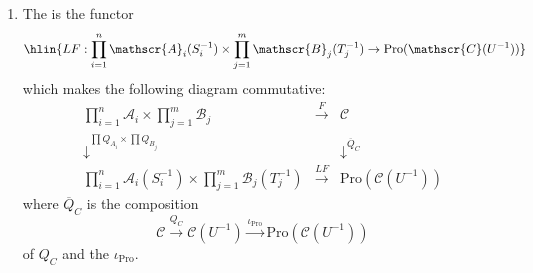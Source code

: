 \begin{definition}
\begin{enumerate}
    \item The  is the functor
    $$\hlin{LF: \prod_{i=1}^n \mathscr{A}_i(S_i^{-1}) \times \prod_{j=1}^m \mathscr{B}_j(T_j^{-1}) \to \text{Pro}(\mathscr{C}(U^{-1}))}$$
    which makes the following diagram commutative:
    $$
    \begin{array}{ccc}
    \prod_{i=1}^n \mathscr{A}_i \times \prod_{j=1}^m \mathscr{B}_j & \xrightarrow{F} & \mathscr{C} \\
    \downarrow^{\prod Q_{A_i} \times \prod Q_{B_j}} & & \downarrow^{\overline{Q}_C} \\
    \prod_{i=1}^n \mathscr{A}_i(S_i^{-1}) \times \prod_{j=1}^m \mathscr{B}_j(T_j^{-1}) & \xrightarrow{LF} & \text{Pro}(\mathscr{C}(U^{-1}))
    \end{array}
    $$
    where $\overline{Q}_C$ is the composition 
    $$\mathscr{C} \xrightarrow{Q_C} \mathscr{C}(U^{-1}) \xrightarrow{\iota_{\text{Pro}}} \text{Pro}(\mathscr{C}(U^{-1}))$$
    of $Q_C$ and the  $\iota_{\text{Pro}}$.
\end{enumerate}
\end{definition}